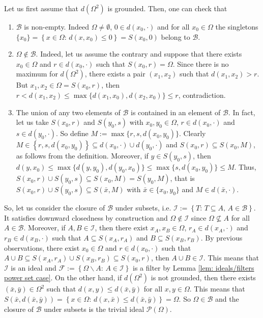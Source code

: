 \documentclass[11pt,british,reqno]{article}
\numberwithin{equation}{section}
\numberwithin{figure}{section}
\numberwithin{table}{section}
\theoremstyle{definition}
\theoremstyle{definition}
\theoremstyle{plain}
\theoremstyle{plain}
\theoremstyle{remark}
\theoremstyle{plain}
\numberwithin{equation}{section}
\numberwithin{figure}{section}
\numberwithin{table}{section}
\theoremstyle{plain}
\begin{document}
Let us first assume that $d(\Omega^{2})$ is grounded. Then, one can check that  
\begin{enumerate}
\item $\mathcal{B}$ is non-empty. Indeed $\Omega\neq\emptyset$, $0\in d(x_{0},\cdot)$ and for all $x_{0}\in\Omega$ the singletons $\{x_{0}\}=\left\{ x\in\Omega:\,d(x,x_{0})\leq0\right\} =S(x_{0},0)$ belong to $\mathcal{B}$.  
\item $\Omega\notin\mathcal{B}$. Indeed, let us assume the contrary and suppose that there exists $x_{0}\in\Omega$ and $r\in d(x_{0},\cdot)$ such that $S(x_{0},r)=\Omega$. Since there is no maximum for $d(\Omega^{2})$,
there exists a pair $(x_{1},x_{2})$ such that $d(x_{1},x_{2})>r$.
But $x_{1},x_{2}\in\Omega=S(x_{0},r)$, then $r<d(x_{1},x_{2})\leq\max\{d(x_{1},x_{0}),d(x_{2},x_{0})\}\leq r$,
contradiction. 
\item The union of any two elements of $\mathcal{B}$ is contained in an element of $\mathcal{B}$. In fact, let us take $S(x_{0},r)$ and $S(y_{0},s)$ with $x_{0},y_{0}\in\Omega$, $r\in d(x_{0},\cdot)$ and $s\in d(y_{0},\cdot)$. So define $M:=\max\{r,s,d(x_{0},y_{0})\}$. Clearly $M\in\left\{ r,s,d(x_{0},y_{0})\right\} \subseteq d(x_{0},\cdot)\cup d(y_{0},\cdot)$ and $S(x_{0},r)\subseteq S(x_{0},M)$, as follows from the definition. Moreover, if $y\in S(y_{0},s)$,  then $d(y,x_{0})\leq\max\{d(y,y_{0}),d(y_{0},x_{0})\}\leq\max\{s,d(x_{0},y_{0})\}\leq M$. Thus, $S(x_{0},r)\cup S(y_{0},s)\subseteq S(x_{0},M)=S(y_{0},M)$, that is $S(x_{0},r)\cup S(y_{0},s)\subseteq S(\bar{x},M)$ with $\bar{x}\in\{x_{0},y_{0}\}$ and $M\in d(\bar{x},\cdot)$. 
\end{enumerate}
So, let us consider the closure of $\mathcal{B}$ under subsets, i.e. $\displaystyle \mathcal{I}:=\left\{ T:\,T\subseteq A,\,A\in\mathcal{B}\right\}$. It satisfies downward closedness by construction and $\Omega\notin\mathcal{I}$ since $\Omega\not\subseteq A$ for all $A\in\mathcal{B}$. Moreover, if $A,B\in\mathcal{I}$, then there exist $x_{A},x_{B}\in\Omega$, $r_{A}\in d(x_{A},\cdot)$ and $r_{B}\in d(x_{B},\cdot)$ such that $A\subseteq S(x_{A},r_{A})$ and $B\subseteq S(x_{B},r_{B})$. By previous observations, there exist $x_{0}\in\Omega$ and $r\in d(x_{0},\cdot)$ such that $A\cup B\subseteq S(x_{A},r_{A})\cup S(x_{B},r_{B})\subseteq S(x_{0},r)$, then $A\cup B\in\mathcal{I}$. This means that $\mathcal{I}$ is an ideal and $\mathcal{F}:=\left\{ \Omega\backslash A:\,A\in\mathcal{I}\right\}$  is a filter by Lemma \ref{lem: ideals/filters power set case}. On
the other hand, if $d(\Omega^{2})$ is not grounded, then there exists
$(\bar{x},\bar{y})\in\Omega^{2}$ such that $d(x,y)\leq d(\bar{x},\bar{y})$
for all $x,y\in\Omega$. This means that $S(\bar{x},d(\bar{x},\bar{y}))=\left\{ x\in\Omega:\,d(x,\bar{x})\leq d(\bar{x},\bar{y})\right\} =\Omega$. So $\Omega\in\mathcal{B}$ and the closure of $\mathcal{B}$ under subsets is the trivial ideal $\mathcal{P}(\Omega)$. 
\end{document}
